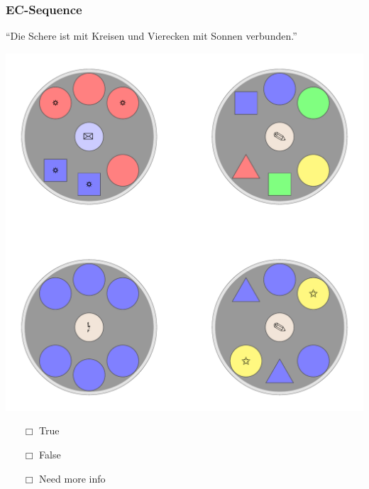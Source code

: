\documentclass[fleqn,10pt,serif,xcolor=dvipsnames]{beamer}
\newcommand{\EC}{EC\xspace}
\newcommand{\mymark}[1]{{\color{blue}{#1}}}
\begin{document}
\begin{frame}
  \frametitle{\EC-Sequence}
  \begin{center}
    ``Die Schere ist mit Kreisen und Vierecken mit Sonnen verbunden.''

    \vspace{0.1cm}

    \includegraphics[width=0.5 \textwidth]{../../pictures/ec_01_1.pdf}

    \vspace{0.1cm}

    \begin{multicols}{3}
      \begin{itemize} 
      \item[$\Box$] True\\
        \onslide<2>{$\leadsto$  \mymark{false}}
      \item[$\Box$] False\\
        \onslide<2>{$\leadsto$ \mymark{false}}
      \item[$\Box$] Need more info 
      \end{itemize}
    \end{multicols}

  \end{center}
\end{frame}
\end{document}
